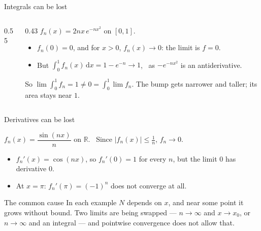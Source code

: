 \documentclass[10pt]{wosm-slides}
\newcommand{\R}{\mathbb{R}}
\newcommand{\dx}{\,\mathrm{d}x}
\begin{document}
\begin{frame}{Integrals can be lost}
  \begin{columns}[c]
    \begin{column}{0.55\textwidth}
    \end{column}
    \begin{column}{0.43\textwidth}
      $f_n(x) = 2nx\, e^{-nx^2}$ on $[0, 1]$.
      \begin{itemize}
        \item $f_n(0) = 0$, and for $x > 0$, $f_n(x) \to 0$: the limit is $f = 0$.
        \item But $\int_0^1 f_n(x)\dx = 1 - e^{-n} \to 1$, \
          as $-e^{-nx^2}$ is an antiderivative.
      \end{itemize}
      So $\lim \int_0^1 f_n = 1 \ne 0 = \int_0^1 \lim f_n$.
      \small The bump gets narrower and taller; its area stays near $1$.
    \end{column}
  \end{columns}
\end{frame}

\begin{frame}{Derivatives can be lost}
  \begin{example}
    $f_n(x) = \dfrac{\sin(nx)}{n}$ on $\R$. \ Since $|f_n(x)| \le \frac1n$, $f_n \to 0$.
    \begin{itemize}
      \item $f_n'(x) = \cos(nx)$, so $f_n'(0) = 1$ for every $n$, but the limit $0$ has
        derivative $0$.
      \item At $x = \pi$: $f_n'(\pi) = (-1)^n$ does not converge at all.
    \end{itemize}
  \end{example}
  \pause
  \begin{block}{The common cause}
    In each example $N$ depends on $x$, and near some point it grows without bound.
    Two limits are being swapped --- $n \to \infty$ and $x \to x_0$, or $n \to \infty$ and
    an integral --- and pointwise convergence does not allow that.
  \end{block}
\end{frame}
\end{document}
